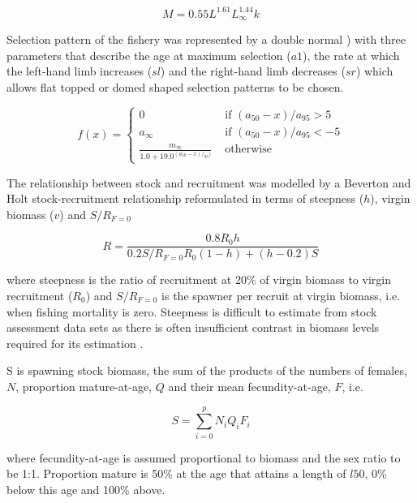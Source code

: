\documentclass[12pt,doublespacing,a4paper]{ouparticle}
\begin{document}
\begin{equation}
            M =  0.55L^{1.61}L_\infty^{1.44}k
\end{equation} 

Selection pattern of the fishery was represented by a double normal \cite[see][]{Hilbornetal2000}) with three parameters that describe the age at maximum selection ($a1$), the rate at which the left-hand  limb increases ($sl$) and the right-hand limb decreases ($sr$) which allows flat topped or domed shaped selection patterns to be chosen.
         
\begin{equation}
f(x) = \left\{ \begin{array}{ll}
			0                                 &\mbox{ if $(a_{50}-x)/a_{95} >  5$} \\
			a_\infty                        &\mbox{ if $(a_{50}-x)/a_{95} < -5$} \\
			\frac{m_\infty}{1.0+19.0^{(a_{50}-x)/_{95})}} &\mbox{ otherwise}
		\end{array}
       \right.
\end{equation}

The relationship between stock and recruitment was modelled by a Beverton and Holt stock-recruitment relationship \citep{beverton1993dynamics} reformulated in terms of steepness ($h$), virgin biomass ($v$) and $S/R_{F=0}$

\begin{equation}
R=\frac{0.8R_0h}{0.2S/R_{F=0}R_0(1-h)+(h-0.2)S}
\end{equation} 

\noindent where steepness is the ratio of recruitment at 20\% of virgin biomass to virgin recruitment ($R_0$) and $S/R_{F=0}$ is the spawner per recruit at virgin biomass, i.e. when fishing mortality is zero. Steepness is difficult to estimate from stock assessment data sets as there is often insufficient contrast in biomass levels required for its estimation \cite{pepin2015reconsidering}.

S is spawning stock biomass, the sum of the products of the numbers of females, $N$, proportion mature-at-age, $Q$ and their mean fecundity-at-age, $F$, i.e. 

\begin{equation} S = \sum\limits_{i=0}^{p} {N_iQ_iF_i} \end{equation}

where fecundity-at-age is assumed proportional to biomass and the sex ratio to be 1:1. Proportion mature is 50\% at the age that attains a length of $l50$, 0\% below this age and 100\% above. 
\end{document}
